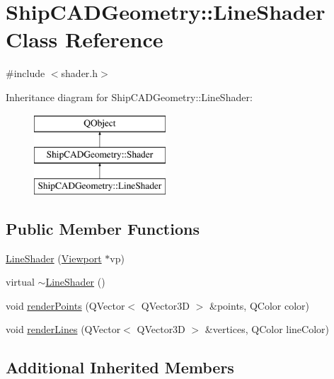 \hypertarget{classShipCADGeometry_1_1LineShader}{\section{Ship\-C\-A\-D\-Geometry\-:\-:Line\-Shader Class Reference}
\label{classShipCADGeometry_1_1LineShader}
}


{\ttfamily \#include $<$shader.\-h$>$}

Inheritance diagram for Ship\-C\-A\-D\-Geometry\-:\-:Line\-Shader\-:\begin{figure}[H]
\begin{center}
\leavevmode
\includegraphics[height=3.000000cm]{classShipCADGeometry_1_1LineShader}
\end{center}
\end{figure}
\subsection*{Public Member Functions}
\begin{DoxyCompactItemize}
\item 
\hyperlink{classShipCADGeometry_1_1LineShader_ae06ecf68dfc054511db3937893850d2f}{Line\-Shader} (\hyperlink{classShipCADGeometry_1_1Viewport}{Viewport} $\ast$vp)
\item 
virtual \hyperlink{classShipCADGeometry_1_1LineShader_a0bbbe35354d12edfff172d35c8023163}{$\sim$\-Line\-Shader} ()
\item 
void \hyperlink{classShipCADGeometry_1_1LineShader_aaa105117e559ec413a733e14dc638b5a}{render\-Points} (Q\-Vector$<$ Q\-Vector3\-D $>$ \&points, Q\-Color color)
\item 
void \hyperlink{classShipCADGeometry_1_1LineShader_a3d30bda1883e0eda65ea23c4da76f610}{render\-Lines} (Q\-Vector$<$ Q\-Vector3\-D $>$ \&vertices, Q\-Color line\-Color)
\end{DoxyCompactItemize}
\subsection*{Additional Inherited Members}


